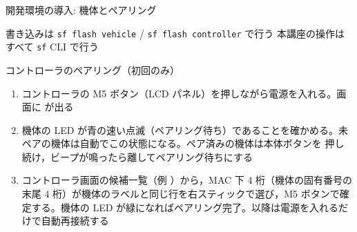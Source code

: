 \begin{frame}{開発環境の導入: 機体とペアリング}
  \begin{block}{書き込みは \texttt{sf flash vehicle} / \texttt{sf flash controller} で行う}
    本講座の操作はすべて \texttt{sf} CLI で行う
  \end{block}

  \vspace{0.2em}

  \begin{exampleblock}{コントローラのペアリング（初回のみ）}
    \scriptsize
    \begin{enumerate}\setlength{\itemsep}{1pt}
      \item コントローラの M5 ボタン（LCD パネル）を押しながら電源を入れる。画面に  が出る
      \item 機体の LED が青の速い点滅（ペアリング待ち）であることを確かめる。未ペアの機体は自動でこの状態になる。ペア済みの機体は本体ボタンを 押し続け，ビープが鳴ったら離してペアリング待ちにする
      \item コントローラ画面の候補一覧（例 ）から，MAC 下 4 桁（機体の固有番号の末尾 4 桁）が機体のラベルと同じ行を右スティックで選び，M5 ボタンで確定する。機体の LED が緑になればペアリング完了。以降は電源を入れるだけで自動再接続する
    \end{enumerate}
  \end{exampleblock}
\end{frame}

